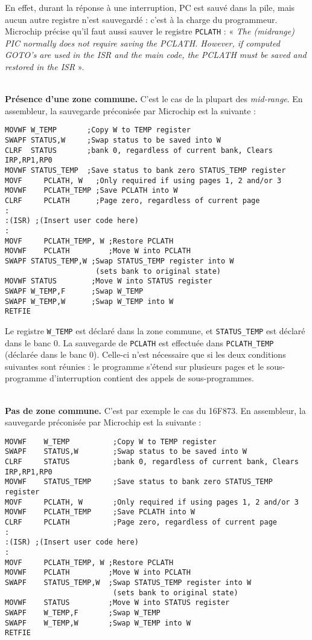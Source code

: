 En effet, durant la réponse à une interruption, PC est sauvé dans la pile, mais aucun autre registre n’est sauvegardé : c’est à la charge du programmeur. Microchip précise qu’il faut aussi sauver le registre \texttt{PCLATH} : « \emph{The (midrange) PIC normally does not require saving the PCLATH. However, if computed GOTO’s are used in the ISR and the main code, the PCLATH must be saved and restored in the ISR} ».



~\\
\textbf{Présence d’une zone commune.} C'est le cas de la plupart des \emph{mid-range}. En assembleur, la sauvegarde préconisée par Microchip est la suivante :

\begin{lstlisting}[language=assembleur]
MOVWF W_TEMP       ;Copy W to TEMP register 
SWAPF STATUS,W     ;Swap status to be saved into W 
CLRF  STATUS       ;bank 0, regardless of current bank, Clears IRP,RP1,RP0 
MOVWF STATUS_TEMP  ;Save status to bank zero STATUS_TEMP register 
MOVF     PCLATH, W   ;Only required if using pages 1, 2 and/or 3 
MOVWF    PCLATH_TEMP ;Save PCLATH into W 
CLRF     PCLATH      ;Page zero, regardless of current page 
: 
:(ISR) ;(Insert user code here) 
: 
MOVF     PCLATH_TEMP, W ;Restore PCLATH 
MOVWF    PCLATH         ;Move W into PCLATH 
SWAPF STATUS_TEMP,W ;Swap STATUS_TEMP register into W
                     (sets bank to original state) 
MOVWF STATUS        ;Move W into STATUS register 
SWAPF W_TEMP,F      ;Swap W_TEMP 
SWAPF W_TEMP,W      ;Swap W_TEMP into W
RETFIE
\end{lstlisting}


Le registre \texttt{W\_TEMP} est déclaré dans la zone commune, et \texttt{STATUS\_TEMP} est déclaré dans le banc 0. La sauvegarde de \texttt{PCLATH} est effectuée dans \texttt{PCLATH\_TEMP} (déclarée dans le banc 0). Celle-ci n'est nécessaire que si les deux conditions suivantes sont réunies : le programme s’étend sur plusieurs pages et le sous-programme d’interruption contient des appels de sous-programmes.


~\\
\textbf{Pas de zone commune.} C’est par exemple le cas du 16F873. En assembleur, la sauvegarde préconisée par Microchip est la suivante :


\begin{lstlisting}[language=assembleur]
MOVWF    W_TEMP          ;Copy W to TEMP register 
SWAPF    STATUS,W        ;Swap status to be saved into W 
CLRF     STATUS          ;bank 0, regardless of current bank, Clears IRP,RP1,RP0 
MOVWF    STATUS_TEMP     ;Save status to bank zero STATUS_TEMP register 
MOVF     PCLATH, W       ;Only required if using pages 1, 2 and/or 3 
MOVWF    PCLATH_TEMP     ;Save PCLATH into W 
CLRF     PCLATH          ;Page zero, regardless of current page 
: 
:(ISR) ;(Insert user code here) 
: 
MOVF     PCLATH_TEMP, W ;Restore PCLATH 
MOVWF    PCLATH         ;Move W into PCLATH 
SWAPF    STATUS_TEMP,W  ;Swap STATUS_TEMP register into W
                         (sets bank to original state) 
MOVWF    STATUS         ;Move W into STATUS register 
SWAPF    W_TEMP,F       ;Swap W_TEMP 
SWAPF    W_TEMP,W       ;Swap W_TEMP into W
RETFIE
\end{lstlisting}

